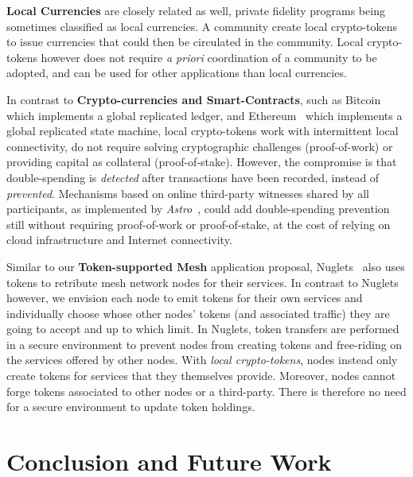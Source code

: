\documentclass[sigconf,9pt]{acmart}
\begin{document}
\textbf{Local Currencies} are closely related as well, private fidelity programs being sometimes classified as local currencies. A community create local crypto-tokens to issue currencies that could then be circulated in the community. Local crypto-tokens however does not require \textit{a priori} coordination of a community to be adopted, and can be used for other applications than local currencies.

In contrast to \textbf{Crypto-currencies and Smart-Contracts}, such as Bitcoin~\cite{nakamoto2008bitcoin} which implements a global replicated ledger, and Ethereum~\cite{buterin2014next} which implements a global replicated state machine, local crypto-tokens work with intermittent local connectivity, do not require solving cryptographic challenges (proof-of-work) or providing capital as collateral (proof-of-stake). However, the compromise is that double-spending is \textit{detected} after transactions have been recorded, instead of \textit{prevented}. Mechanisms based on online third-party witnesses shared by all participants, as implemented by \textit{Astro}~\cite{collins2020online}, could add double-spending prevention still without requiring proof-of-work or proof-of-stake, at the cost of relying on cloud infrastructure and Internet connectivity.

Similar to our \textbf{Token-supported Mesh} application proposal, Nuglets~\cite{buttyan2001nuglets} also uses tokens to retribute mesh network nodes for their services. In contrast to Nuglets however, we envision each node to emit tokens for their own services and individually choose whose other nodes' tokens (and associated traffic) they are going to accept and up to which limit. In Nuglets, token transfers are performed in a secure environment to prevent nodes from creating tokens and free-riding on the services offered by other nodes. With \textit{local crypto-tokens}, nodes instead only create tokens for services that they themselves provide. Moreover, nodes cannot forge tokens associated to other nodes or a third-party. There is therefore no need for a secure environment to update token holdings. 

\section{Conclusion and Future Work}
\label{section:conclusion}
\end{document}
